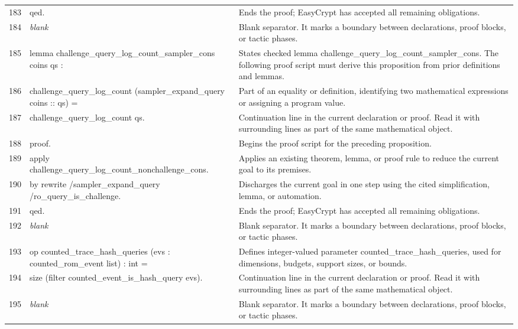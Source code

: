 \documentclass[10pt]{article}
\begin{document}
\begin{longtable}{r L{0.53\textwidth} L{0.37\textwidth}}
183 & {\ttfamily\scriptsize qed.} & Ends the proof; EasyCrypt has accepted all remaining obligations. \\
184 & {\ttfamily\scriptsize \emph{blank}} & Blank separator.  It marks a boundary between declarations, proof blocks, or tactic phases. \\
185 & {\ttfamily\scriptsize lemma challenge\_query\_log\_count\_sampler\_cons coins qs :} & States checked lemma challenge\_query\_log\_count\_sampler\_cons.  The following proof script must derive this proposition from prior definitions and lemmas. \\
186 & {\ttfamily\scriptsize   challenge\_query\_log\_count (sampler\_expand\_query coins :: qs) =} & Part of an equality or definition, identifying two mathematical expressions or assigning a program value. \\
187 & {\ttfamily\scriptsize   challenge\_query\_log\_count qs.} & Continuation line in the current declaration or proof.  Read it with surrounding lines as part of the same mathematical object. \\
188 & {\ttfamily\scriptsize proof.} & Begins the proof script for the preceding proposition. \\
189 & {\ttfamily\scriptsize apply challenge\_query\_log\_count\_nonchallenge\_cons.} & Applies an existing theorem, lemma, or proof rule to reduce the current goal to its premises. \\
190 & {\ttfamily\scriptsize by rewrite /sampler\_expand\_query /ro\_query\_is\_challenge.} & Discharges the current goal in one step using the cited simplification, lemma, or automation. \\
191 & {\ttfamily\scriptsize qed.} & Ends the proof; EasyCrypt has accepted all remaining obligations. \\
192 & {\ttfamily\scriptsize \emph{blank}} & Blank separator.  It marks a boundary between declarations, proof blocks, or tactic phases. \\
193 & {\ttfamily\scriptsize op counted\_trace\_hash\_queries (evs : counted\_rom\_event list) : int =} & Defines integer-valued parameter counted\_trace\_hash\_queries, used for dimensions, budgets, support sizes, or bounds. \\
194 & {\ttfamily\scriptsize   size (filter counted\_event\_is\_hash\_query evs).} & Continuation line in the current declaration or proof.  Read it with surrounding lines as part of the same mathematical object. \\
195 & {\ttfamily\scriptsize \emph{blank}} & Blank separator.  It marks a boundary between declarations, proof blocks, or tactic phases. \\

\end{longtable}
\end{document}
